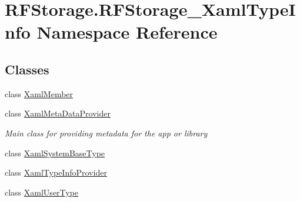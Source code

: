 \hypertarget{namespace_r_f_storage_1_1_r_f_storage___xaml_type_info}{}\section{R\+F\+Storage.\+R\+F\+Storage\+\_\+\+Xaml\+Type\+Info Namespace Reference}
\label{namespace_r_f_storage_1_1_r_f_storage___xaml_type_info}
\subsection*{Classes}
\begin{DoxyCompactItemize}
\item 
class \mbox{\hyperlink{class_r_f_storage_1_1_r_f_storage___xaml_type_info_1_1_xaml_member}{Xaml\+Member}}
\item 
class \mbox{\hyperlink{class_r_f_storage_1_1_r_f_storage___xaml_type_info_1_1_xaml_meta_data_provider}{Xaml\+Meta\+Data\+Provider}}
\begin{DoxyCompactList}\small\item\em Main class for providing metadata for the app or library \end{DoxyCompactList}\item 
class \mbox{\hyperlink{class_r_f_storage_1_1_r_f_storage___xaml_type_info_1_1_xaml_system_base_type}{Xaml\+System\+Base\+Type}}
\item 
class \mbox{\hyperlink{class_r_f_storage_1_1_r_f_storage___xaml_type_info_1_1_xaml_type_info_provider}{Xaml\+Type\+Info\+Provider}}
\item 
class \mbox{\hyperlink{class_r_f_storage_1_1_r_f_storage___xaml_type_info_1_1_xaml_user_type}{Xaml\+User\+Type}}
\end{DoxyCompactItemize}
